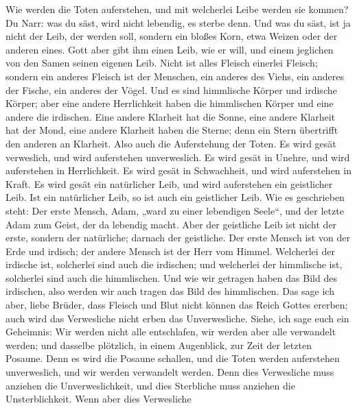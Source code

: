 Wie werden die Toten auferstehen, und mit welcherlei Leibe werden sie
kommen?  Du Narr: was du säst, wird nicht lebendig, es
sterbe denn.  Und was du säst, ist ja nicht der Leib, der
werden soll, sondern ein bloßes Korn, etwa Weizen oder der anderen
eines.  Gott aber gibt ihm einen Leib, wie er will, und
einem jeglichen von den Samen seinen eigenen Leib.  Nicht
ist alles Fleisch einerlei Fleisch; sondern ein anderes Fleisch ist der
Menschen, ein anderes des Viehs, ein anderes der Fische, ein anderes der
Vögel.  Und es sind himmlische Körper und irdische Körper;
aber eine andere Herrlichkeit haben die himmlischen Körper und eine
andere die irdischen.  Eine andere Klarheit hat die Sonne,
eine andere Klarheit hat der Mond, eine andere Klarheit haben die
Sterne; denn ein Stern übertrifft den anderen an Klarheit. 
Also auch die Auferstehung der Toten. Es wird gesät verweslich, und wird
auferstehen unverweslich.  Es wird gesät in Unehre, und
wird auferstehen in Herrlichkeit. Es wird gesät in Schwachheit, und wird
auferstehen in Kraft.  Es wird gesät ein natürlicher Leib,
und wird auferstehen ein geistlicher Leib. Ist ein natürlicher Leib, so
ist auch ein geistlicher Leib.  Wie es geschrieben steht:
Der erste Mensch, Adam, „ward zu einer lebendigen Seele``, und der
letzte Adam zum Geist, der da lebendig macht.  Aber der
geistliche Leib ist nicht der erste, sondern der natürliche; darnach der
geistliche.  Der erste Mensch ist von der Erde und irdisch;
der andere Mensch ist der Herr vom Himmel.  Welcherlei der
irdische ist, solcherlei sind auch die irdischen; und welcherlei der
himmlische ist, solcherlei sind auch die himmlischen.  Und
wie wir getragen haben das Bild des irdischen, also werden wir auch
tragen das Bild des himmlischen.  Das sage ich aber, liebe
Brüder, dass Fleisch und Blut nicht können das Reich Gottes ererben;
auch wird das Verwesliche nicht erben das Unverwesliche. 
Siehe, ich sage euch ein Geheimnis: Wir werden nicht alle entschlafen,
wir werden aber alle verwandelt werden;  und dasselbe
plötzlich, in einem Augenblick, zur Zeit der letzten Posaune. Denn es
wird die Posaune schallen, und die Toten werden auferstehen
unverweslich, und wir werden verwandelt werden.  Denn dies
Verwesliche muss anziehen die Unverweslichkeit, und dies Sterbliche muss
anziehen die Unsterblichkeit.  Wenn aber dies Verwesliche
